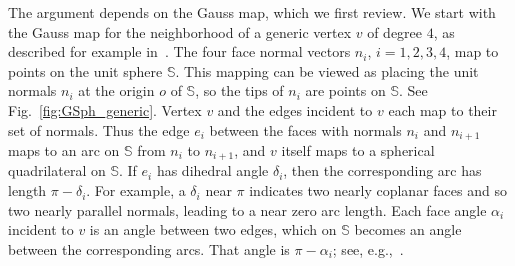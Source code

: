 \documentclass[11pt]{article}
\newcommand{\figref}[1]{\ref{fig:#1}}
\def\a{{\alpha}}
\def\d{{\delta}}
\def\S{{\mathbb{S}}}
\newcommand{\JOR}[1]{{\color{red} JOR: [#1]}}
\newcommand{\Anna}[1]{{\color{red} Anna: [#1]}}
\begin{document}
The argument depends on the Gauss map, which we first review.
We start with the Gauss map
for the neighborhood of 
a generic vertex $v$ of
degree $4$,
as described for example in~\cite{biedl2007cauchy}.
The four face normal vectors $n_i$, $i=1,2,3,4$, map to points
on the unit sphere $\S$.
This mapping can be viewed as placing the unit normals $n_i$ at the origin $o$
of $\S$, so the tips of $n_i$ are points on $\S$.
See Fig.~\figref{GSph_generic}.
Vertex $v$ and the edges incident to $v$ each map to their set of normals.  Thus the edge $e_i$ between the faces with normals $n_i$ and $n_{i+1}$ maps to an arc on $\S$ from $n_i$ to $n_{i+1}$, and $v$ itself maps to a spherical quadrilateral on $\S$. If $e_i$ has dihedral angle $\d_i$, then the corresponding arc has length $\pi - \d_i$.
For example, a $\d_i$ near $\pi$ indicates two nearly coplanar faces and
so two nearly parallel normals, leading to a near zero arc length.
Each face angle $\a_i$ incident to $v$ is an angle between two edges,
which on $\S$ becomes an angle between the corresponding %
arcs.
That angle is $\pi-\a_i$;
see, e.g.,~\cite{s-gpcpl-68}.
\end{document}
